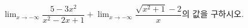 $\displaystyle\lim_{x\to -\infty}\dfrac{5-3x^2}{x^2-2x+1}+\lim_{x\to -\infty}\dfrac{\sqrt{x^2+1}-2}{x}$의 값을 구하시오.
